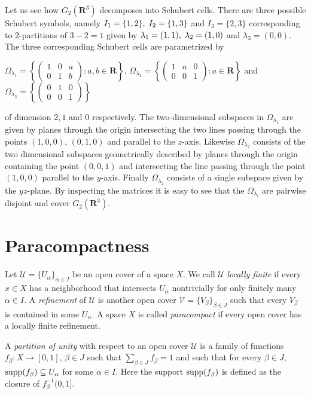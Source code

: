 \documentclass[a4paper,openany]{scrbook}
\begin{document}
\begin{example}
Let us see how $G_2(\mathbf{R}^3)$ decomposes into Schubert cells. There are three possible Schubert symbols, namely $I_1 = \{ 1,2 \}, \thickspace I_2 = \{ 1,3 \}$ and $I_3 = \{ 2,3 \}$ corresponding to $2$-partitions of $3-2 = 1$ given by $\lambda_1 = (1,1), \thickspace \lambda_2 = (1,0)$ and $\lambda_3 = (0,0)$. 
The three corresponding Schubert cells are parametrized by
\begin{center}
$\displaystyle \Omega_{\lambda_1} = \left \{  \begin{pmatrix} 1 & 0 & a \\ 0 & 1 & b \end{pmatrix} : a,b \in \mathbf{R} \right \}$, $\displaystyle \Omega_{\lambda_2} = \left \{  \begin{pmatrix} 1 & a & 0 \\ 0 & 0 & 1 \end{pmatrix} : a \in \mathbf{R} \right \}$ and $\displaystyle \Omega_{\lambda_3} = \left \{  \begin{pmatrix} 0 & 1 & 0 \\ 0 & 0 & 1 \end{pmatrix} \right \}$
\end{center}
of dimension $2,1$ and $0$ respectively. The two-dimensional subspaces in $\Omega_{\lambda_1}$ are given by planes  through the origin intersecting the two lines passing through the points $(1,0,0)$, $(0,1,0)$ and parallel to the $z$-axis. Likewise $\Omega_{\lambda_2}$ consists of the two dimensional subspaces geometrically described by planes through the origin containing the point $(0,0,1)$ and intersecting the line passing through the point $(1,0,0)$ parallel to the $y$-axis. Finally $\Omega_{\lambda_2}$ consists of a single subspace given by the $yz$-plane. By inspecting the matrices it is easy to see that the $\Omega_{\lambda_i}$ are pairwise disjoint and cover $G_2(\mathbf{R}^3)$.
\end{example}

\section{Paracompactness}\label{sec:paracompactness}

\begin{defn}
Let $\mathcal U = \{U_\alpha\}_{\alpha \in I}$ be an open cover of a space $X$. We call $\mathcal U$ \emph{locally finite} if every $x \in X$ has a neighborhood that intersects $U_\alpha$ nontrivially for only finitely many $\alpha \in I$. A \emph{refinement} of $\mathcal U$ is another open cover $\mathcal V = \{V_\beta\}_{\beta \in J}$ such that every $V_\beta$ is contained in some $U_\alpha$. A space $X$ is called \emph{paracompact} if every open cover has a locally finite refinement.

A \emph{partition of unity} with respect to an open cover $\mathcal U$ is a family of functions $f_\beta\colon X \to [0,1]$, $\beta \in J$ such that $\sum_{\beta \in J} f_{\beta} = 1$ and such that for every $\beta \in J$, $\operatorname{supp}(f_\beta) \subseteq U_\alpha$ for some $\alpha \in I$. Here the support $\operatorname{supp}(f_\beta)$ is defined as the closure of $f_\beta^{-1}(0,1]$.
\end{defn}
\end{document}
